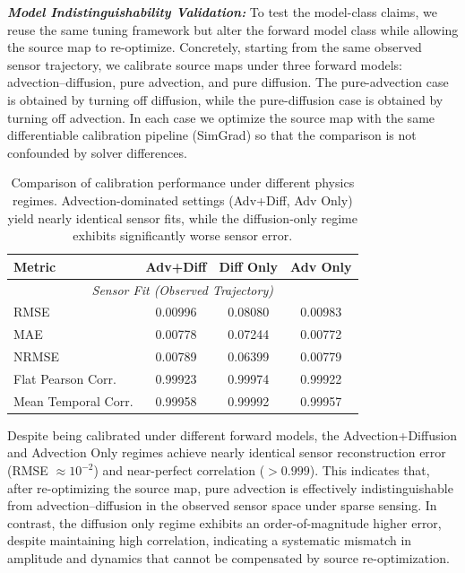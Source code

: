 \textit{\textbf{Model Indistinguishability Validation:}} To test the model-class claims, we reuse the same tuning framework but alter the forward model class while allowing the source map to re-optimize. Concretely, starting from the same observed sensor trajectory, we calibrate source maps under three forward models: advection--diffusion, pure advection, and pure diffusion. The pure-advection case is obtained by turning off diffusion, while the pure-diffusion case is obtained by turning off advection. In each case we optimize the source map with the same differentiable calibration pipeline (SimGrad) so that the comparison is not confounded by solver differences.

\begin{table}[t]
\centering
\small
\begin{tabular}{lccc}
\toprule
\textbf{Metric} & \textbf{Adv+Diff} & \textbf{Diff Only} & \textbf{Adv Only} \\
\midrule
\multicolumn{4}{c}{\textit{Sensor Fit (Observed Trajectory)}} \\
RMSE & 0.00996 & 0.08080 & 0.00983 \\
MAE  & 0.00778 & 0.07244 & 0.00772 \\
NRMSE & 0.00789 & 0.06399 & 0.00779 \\
Flat Pearson Corr. & 0.99923 & 0.99974 & 0.99922 \\
Mean Temporal Corr. & 0.99958 & 0.99992 & 0.99957 \\
\bottomrule
\end{tabular}
\caption{
Comparison of calibration performance under different physics regimes. 
Advection-dominated settings (Adv+Diff, Adv Only) yield nearly identical sensor fits, 
while the diffusion-only regime exhibits significantly worse sensor error.
}
\label{tab:pol_regime_comparison}
\end{table}

Despite being calibrated under different forward models, the Advection+Diffusion and Advection Only regimes achieve nearly identical sensor reconstruction error (RMSE $\approx 10^{-2}$) and near-perfect correlation ($>0.999$). This indicates that, after re-optimizing the source map, pure advection is effectively indistinguishable from advection--diffusion in the observed sensor space under sparse sensing. In contrast, the diffusion only regime exhibits an order-of-magnitude higher error, despite maintaining high correlation, indicating a systematic mismatch in amplitude and dynamics that cannot be compensated by source re-optimization. 


